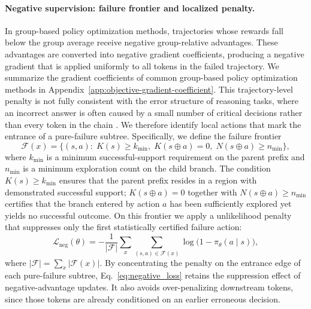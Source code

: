 \documentclass{article}
\begin{document}
\paragraph{Negative supervision: failure frontier and localized penalty.}
In group-based policy optimization methods, trajectories whose rewards fall below the group average receive negative group-relative advantages. These advantages are converted into negative gradient coefficients, producing a negative gradient that is applied uniformly to all tokens in the failed trajectory. We summarize the gradient coefficients of common group-based policy optimization methods in Appendix~\ref{app:objective-gradient-coefficient}.
This trajectory-level penalty is not fully consistent with the error structure of
reasoning tasks, where an incorrect answer is often caused by a small number of
critical decisions rather than every token in the chain \citep{lin2025critical}.
We therefore identify local actions that mark the entrance of a pure-failure subtree.  Specifically, we define the failure frontier
\begin{equation}
\mathcal{F}(x)
=
\bigl\{(s,a):\;K(s)\ge k_{\min},\;
K(s\oplus a)=0,\;
N(s\oplus a)\ge n_{\min}\bigr\},
\label{eq:frontier_set}
\end{equation}
where $k_{\min}$ is a minimum successful-support requirement on the parent prefix
and $n_{\min}$ is a minimum exploration count on the child branch.
The condition $K(s)\ge k_{\min}$ ensures that the parent prefix resides in a
region with demonstrated successful support; $K(s\oplus a)=0$ together with
$N(s\oplus a)\ge n_{\min}$ certifies that the branch entered by action $a$ has
been sufficiently explored yet yields no successful outcome.
On this frontier we apply a unlikelihood penalty that suppresses only
the first statistically certified failure action:
\begin{equation}
\mathcal{L}_{\mathrm{neg}}(\theta)
=
-\frac{1}{|\mathcal{F}|}
\sum_{x}\sum_{(s,a)\in\mathcal{F}(x)}
\log\bigl(1-\pi_\theta(a\mid s)\bigr),
\label{eq:negative_loss}
\end{equation}
where $|\mathcal{F}|=\sum_{x}|\mathcal{F}(x)|$.
By concentrating the penalty on the entrance edge of each pure-failure subtree,
Eq.~\eqref{eq:negative_loss} retains the suppression effect of negative-advantage
updates.
It also avoids over-penalizing downstream tokens, since those tokens are already
conditioned on an earlier erroneous decision.
\end{document}

